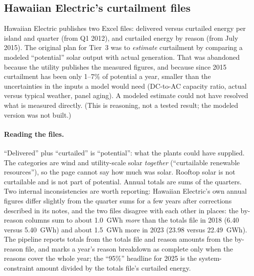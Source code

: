 \documentclass[11pt,a4paper]{article}
\begin{document}
\subsection{Hawaiian Electric's curtailment files}
\label{sec:tier3}
Hawaiian Electric publishes two Excel files: delivered versus curtailed energy per island and quarter (from Q1
2012), and curtailed energy by reason (from July 2015). The original plan for Tier~3 was to \emph{estimate}
curtailment by comparing a modeled ``potential'' solar output with actual generation. That was abandoned because
the utility publishes the measured figures, and because since 2015 curtailment has been only 1--7\% of potential
a year, smaller than the uncertainties in the inputs a model would need (DC-to-AC capacity ratio, actual versus
typical weather, panel aging). A modeled estimate could not have resolved what is measured directly. (This is
reasoning, not a tested result; the modeled version was not built.)

\paragraph{Reading the files.} ``Delivered'' plus ``curtailed'' is ``potential'': what the plants could have
supplied. The categories are wind and utility-scale solar \emph{together} (``curtailable renewable
resources''), so the page cannot say how much was solar. Rooftop solar is not curtailable and is not part of
potential. Annual totals are sums of the quarters. Two internal inconsistencies are worth reporting: Hawaiian
Electric's own annual figures differ slightly from the quarter sums for a few years after corrections described
in its notes, and the two files disagree with each other in places: the by-reason columns sum to about 1.0~GWh
\emph{more} than the totals file in 2018 (6.40 versus 5.40~GWh) and about 1.5~GWh more in 2023 (23.98 versus
22.49~GWh). The pipeline reports totals from the totals file and reason amounts from the by-reason file, and marks a
year's reason breakdown as complete only when the reasons cover the whole year; the ``95\%'' headline for 2025 is
the system-constraint amount divided by the totals file's curtailed energy.
\end{document}
